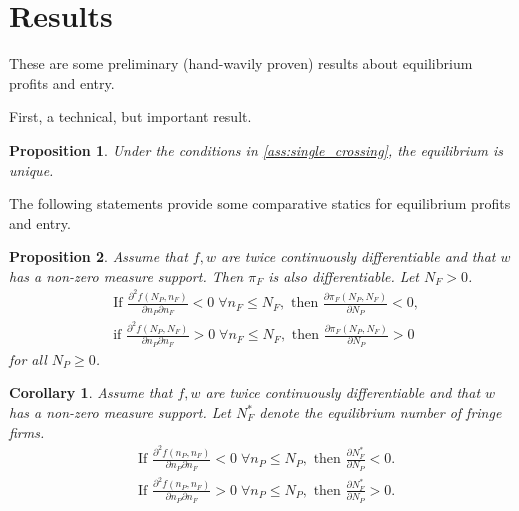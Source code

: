 \documentclass[a4paper]{article}
\newtheorem{proposition}{Proposition}
\newtheorem{corollary}{Corollary}
\begin{document}
\section{Results}

These are some preliminary (hand-wavily proven) results about equilibrium profits and entry.

First, a technical, but important result.
\begin{proposition}
    \label{prop:unique_equilibrium}
    Under the conditions in \cref{ass:single_crossing}, the equilibrium is unique.
\end{proposition}

The following statements provide some comparative statics for equilibrium profits and entry.

\begin{proposition}
    \label{prop:share_of_fringe}
    Assume that $f, w$ are twice continuously differentiable and that $w$ has a non-zero measure support.
    Then $\pi_F$ is also differentiable. Let $N_F > 0$.
    \begin{align*}
        &\text{If } \frac{\partial^2 f(N_P, n_F)}{\partial n_P \partial n_F} < 0 \;\forall n_F \leq N_F, \text{ then } \frac{\partial \pi_F(N_P, N_F)}{\partial N_P} < 0, \\
        &\text{if } \frac{\partial^2 f(N_P, N_F)}{\partial n_P \partial n_F} > 0 \;\forall n_F \leq N_F, \text{ then } \frac{\partial \pi_F(N_P, N_F)}{\partial N_P} > 0
    \end{align*}
    for all $N_P \geq 0$.
\end{proposition}

\begin{corollary}
    \label{cor:fringe_entry}
    Assume that $f, w$ are twice continuously differentiable and that $w$ has a non-zero measure support.
    Let $N_F^*$ denote the equilibrium number of fringe firms.
    \begin{align*}
        &\text{If } \frac{\partial^2 f(n_P, n_F)}{\partial n_P \partial n_F} < 0 \;\forall n_P \leq N_P, \text{ then } \frac{\partial N_F^*}{\partial N_P} < 0. \\
        &\text{If } \frac{\partial^2 f(n_P, n_F)}{\partial n_P \partial n_F} > 0 \;\forall n_P \leq N_P, \text{ then } \frac{\partial N_F^*}{\partial N_P} > 0.
    \end{align*}
\end{corollary}
\end{document}
